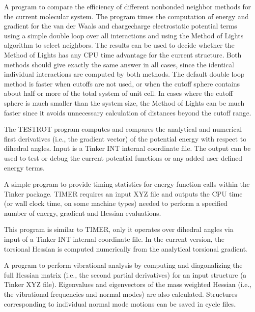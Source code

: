 \documentclass[letterpaper,11pt,english]{sphinxmanual}
\begin{document}

A program to compare the efficiency of different nonbonded neighbor methods for the current molecular system. The program times the computation of energy and gradient for the van der Waals and charge\sphinxhyphen{}charge electrostatic potential terms using a simple double loop over all interactions and using the Method of Lights algorithm to select neighbors. The results can be used to decide whether the Method of Lights has any CPU time advantage for the current structure. Both methods should give exactly the same answer in all cases, since the identical individual interactions are computed by both methods. The default double loop method is faster when cutoffs are not used, or when the cutoff sphere contains about half or more of the total system of unit cell. In cases where the cutoff sphere is much smaller than the system size, the Method of Lights can be much faster since it avoids unnecessary calculation of distances beyond the cutoff range.



The TESTROT program computes and compares the analytical and numerical first derivatives (i.e., the gradient vector) of the potential energy with respect to dihedral angles. Input is a Tinker INT internal coordinate file. The output can be used to test or debug the current potential functions or any added user defined energy terms.



A simple program to provide timing statistics for energy function calls within the Tinker package. TIMER requires an input XYZ file and outputs the CPU time (or wall clock time, on some machine types) needed to perform a specified number of energy, gradient and Hessian evaluations.


This program is similar to TIMER, only it operates over dihedral angles via input of a Tinker INT internal coordinate file. In the current version, the torsional Hessian is computed numerically from the analytical torsional gradient.



A program to perform vibrational analysis by computing and diagonalizing the full Hessian matrix (i.e., the second partial derivatives) for an input structure (a Tinker XYZ file). Eigenvalues and eigenvectors of the mass weighted Hessian (i.e., the vibrational frequencies and normal modes) are also calculated. Structures corresponding to individual normal mode motions can be saved in cycle files.
\end{document}
